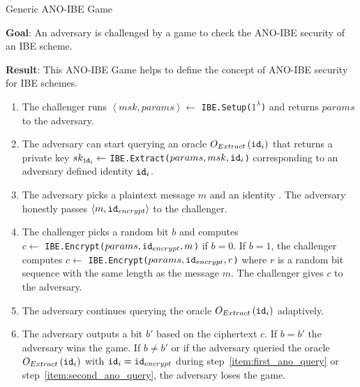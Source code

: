 \begin{game}
\caption{Generic ANO-IBE Game~\cite{thesis:Alfredo08}}
\label{game:ano_ibe}
\begin{description}
 \item \textbf{Goal}: An adversary is challenged by a game to check the ANO-IBE security of an IBE scheme.
 
 \item \textbf{Result}: This ANO-IBE Game helps to define the concept of ANO-IBE security for IBE schemes.
\end{description}
 \begin{enumerate}
  \item The challenger runs $\left< msk, params\right> \leftarrow$ \texttt{IBE.Setup($1^{\lambda}$)} and returns $params$ to the adversary.
  \item \label{item:first_ano_query} The adversary can start querying an oracle $O_{Extract} \left( \mathtt{id}_{i} \right)$ that returns a private key $sk_{\mathtt{id}_{i}} \leftarrow$ \texttt{IBE.Extract($params, msk, \mathtt{id}_{i}$)} corresponding to an adversary defined identity $\mathtt{id}_{i}$.
  \item The adversary picks a plaintext message $m$ and an identity . The adversary honestly passes $\left< m, \mathtt{id}_{encrypt} \right>$ to the challenger.
  \item The challenger picks a random bit $b$ and computes \\ $c \leftarrow$ \texttt{IBE.Encrypt($params, \mathtt{id}_{encrypt}, m$)} if $b=0$. If $b=1$, the challenger computes $c \leftarrow$ \texttt{IBE.Encrypt($params, \mathtt{id}_{encrypt}, r$)} where $r$ is a random bit sequence with the same length as the message $m$. The challenger gives $c$ to the adversary.
  \item \label{item:second_ano_query} The adversary continues querying the oracle $O_{Extract} \left( \mathtt{id}_{i} \right)$ adaptively.
  \item The adversary outputs a bit $b'$ based on the ciphertext $c$. If $b = b'$ the adversary wins the game. If $b \neq b'$ or if the adversary queried the oracle $O_{Extract} \left( \mathtt{id}_{i} \right)$ with $\mathtt{id}_{i} = \mathtt{id}_{encrypt}$ during step~\ref{item:first_ano_query} or step~\ref{item:second_ano_query}, the adversary loses the game.
 \end{enumerate}
\end{game}



